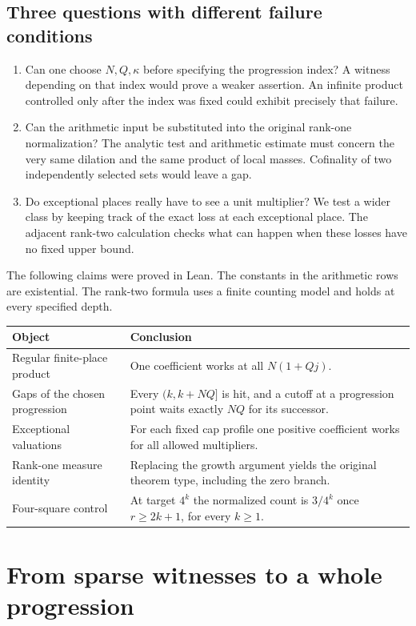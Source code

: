 \documentclass[12pt,letterpaper]{article}
\begin{document}
\subsection{Three questions with different failure conditions}
\begin{enumerate}
\item Can one choose $N,Q,\kappa$ before specifying the progression index? A witness depending on that index would prove a weaker assertion. An infinite product controlled only after the index was fixed could exhibit precisely that failure.
\item Can the arithmetic input be substituted into the original rank-one normalization? The analytic test and arithmetic estimate must concern the very same dilation and the same product of local masses. Cofinality of two independently selected sets would leave a gap.
\item Do exceptional places really have to see a unit multiplier? We test a wider class by keeping track of the exact loss at each exceptional place. The adjacent rank-two calculation checks what can happen when these losses have no fixed upper bound.
\end{enumerate}

The following claims were proved in Lean. The constants in the arithmetic rows are existential. The rank-two formula uses a finite counting model and holds at every specified depth.
\begin{center}\small\begin{tabularx}{\linewidth}{@{}lY@{}}\toprule
Object & Conclusion\\\midrule
Regular finite-place product & One coefficient works at all $N(1+Qj)$.\\
Gaps of the chosen progression & Every $(k,k+NQ]$ is hit, and a cutoff at a progression point waits exactly $NQ$ for its successor.\\
Exceptional valuations & For each fixed cap profile one positive coefficient works for all allowed multipliers.\\
Rank-one measure identity & Replacing the growth argument yields the original theorem type, including the zero branch.\\
Four-square control & At target $4^k$ the normalized count is $3/4^k$ once $r\ge2k+1$, for every $k\ge1$.\\\bottomrule
\end{tabularx}\end{center}

\section{From sparse witnesses to a whole progression}
\end{document}
